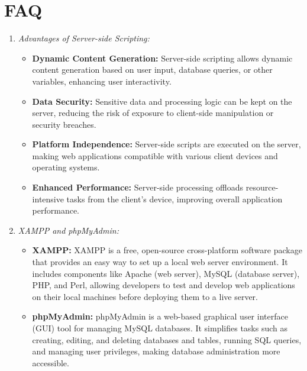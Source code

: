 \documentclass[11pt]{article}
\begin{document}
\section{FAQ}
\begin{enumerate}
    \item \textit{Advantages of Server-side Scripting:}
    \begin{itemize}
        \item \textbf{Dynamic Content Generation:} Server-side scripting allows dynamic content generation based on user input, database queries, or other variables, enhancing user interactivity.
        \item \textbf{Data Security:} Sensitive data and processing logic can be kept on the server, reducing the risk of exposure to client-side manipulation or security breaches.
        \item \textbf{Platform Independence:} Server-side scripts are executed on the server, making web applications compatible with various client devices and operating systems.
        \item \textbf{Enhanced Performance:} Server-side processing offloads resource-intensive tasks from the client's device, improving overall application performance.
    \end{itemize}
    
    \item \textit{XAMPP and phpMyAdmin:}
    \begin{itemize}
        \item \textbf{XAMPP:} XAMPP is a free, open-source cross-platform software package that provides an easy way to set up a local web server environment. It includes components like Apache (web server), MySQL (database server), PHP, and Perl, allowing developers to test and develop web applications on their local machines before deploying them to a live server.
        \item \textbf{phpMyAdmin:} phpMyAdmin is a web-based graphical user interface (GUI) tool for managing MySQL databases. It simplifies tasks such as creating, editing, and deleting databases and tables, running SQL queries, and managing user privileges, making database administration more accessible.
    \end{itemize}
    

\end{enumerate}
\end{document}
